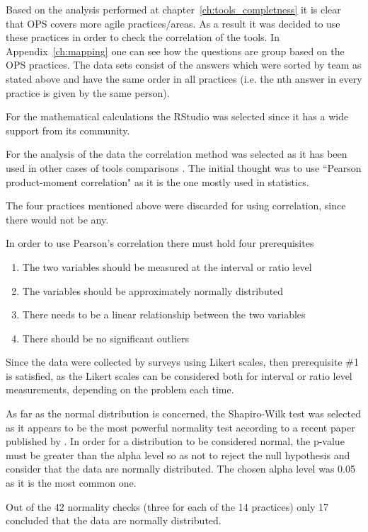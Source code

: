 Based on the analysis performed at chapter~\ref{ch:tools_completness} it is clear that OPS covers more agile practices/areas. As a result it was decided to use these practices in order to check the correlation of the tools. In Appendix~\ref{ch:mapping} one can see how the questions are group based on the OPS practices. The data sets consist of the answers which were sorted by team as stated above and have the same order in all practices (i.e. the nth answer in every practice is given by the same person).

For the mathematical calculations the RStudio \texttrademark \cite{rstudio} was selected since it has a wide support from its community. 

For the analysis of the data the correlation method was selected as it has been used in other cases of tools comparisons \cite{jalali_angelis} \cite{Delestras2013}. The initial thought was to use ``Pearson product-moment correlation" as it is the one mostly used in statistics. 

The four practices mentioned above were discarded for using correlation, since there would not be any.

In order to use Pearson’s correlation there must hold four prerequisites
\begin{enumerate}
\item The two variables should be measured at the interval or ratio level
\item The variables should be approximately normally distributed
\item There needs to be a linear relationship between the two variables
\item There should be no significant outliers
\end{enumerate}

Since the data were collected by surveys using Likert scales, then prerequisite \#1 is satisfied, as the Likert scales can be considered both for interval or ratio level measurements, depending on the problem each time.

As far as the normal distribution is concerned, the Shapiro-Wilk test was selected as it appears to be the most powerful normality test according to a recent paper published by \citet{Razali}. In order for a distribution to be considered normal, the p-value must be greater than the alpha level so as not to reject the null hypothesis and consider that the data are normally distributed. The chosen alpha level was 0.05 as it is the most common one.

Out of the 42 normality checks (three for each of the 14 practices) only 17 concluded that the data are normally distributed. 


